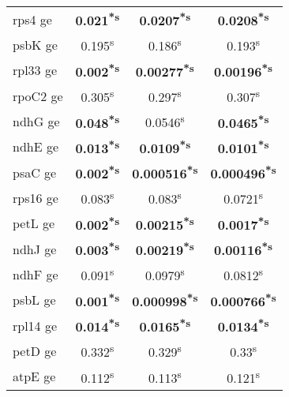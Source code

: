 \documentclass[a4paper]{article}
\begin{document}
\begin{longtable}{l|c|c|c}
rps4 ge&\textbf{0.021\textsuperscript{*}\textsuperscript{s}}&\textbf{0.0207\textsuperscript{*}\textsuperscript{s}}&\textbf{0.0208\textsuperscript{*}\textsuperscript{s}}\\
psbK ge&0.195\textsuperscript{s}&0.186\textsuperscript{s}&0.193\textsuperscript{s}\\
rpl33 ge&\textbf{0.002\textsuperscript{*}\textsuperscript{s}}&\textbf{0.00277\textsuperscript{*}\textsuperscript{s}}&\textbf{0.00196\textsuperscript{*}\textsuperscript{s}}\\
rpoC2 ge&0.305\textsuperscript{s}&0.297\textsuperscript{s}&0.307\textsuperscript{s}\\
ndhG ge&\textbf{0.048\textsuperscript{*}\textsuperscript{s}}&0.0546\textsuperscript{s}&\textbf{0.0465\textsuperscript{*}\textsuperscript{s}}\\
ndhE ge&\textbf{0.013\textsuperscript{*}\textsuperscript{s}}&\textbf{0.0109\textsuperscript{*}\textsuperscript{s}}&\textbf{0.0101\textsuperscript{*}\textsuperscript{s}}\\
psaC ge&\textbf{0.002\textsuperscript{*}\textsuperscript{s}}&\textbf{0.000516\textsuperscript{*}\textsuperscript{s}}&\textbf{0.000496\textsuperscript{*}\textsuperscript{s}}\\
rps16 ge&0.083\textsuperscript{s}&0.083\textsuperscript{s}&0.0721\textsuperscript{s}\\
petL ge&\textbf{0.002\textsuperscript{*}\textsuperscript{s}}&\textbf{0.00215\textsuperscript{*}\textsuperscript{s}}&\textbf{0.0017\textsuperscript{*}\textsuperscript{s}}\\
ndhJ ge&\textbf{0.003\textsuperscript{*}\textsuperscript{s}}&\textbf{0.00219\textsuperscript{*}\textsuperscript{s}}&\textbf{0.00116\textsuperscript{*}\textsuperscript{s}}\\
ndhF ge&0.091\textsuperscript{s}&0.0979\textsuperscript{s}&0.0812\textsuperscript{s}\\
psbL ge&\textbf{0.001\textsuperscript{*}\textsuperscript{s}}&\textbf{0.000998\textsuperscript{*}\textsuperscript{s}}&\textbf{0.000766\textsuperscript{*}\textsuperscript{s}}\\
rpl14 ge&\textbf{0.014\textsuperscript{*}\textsuperscript{s}}&\textbf{0.0165\textsuperscript{*}\textsuperscript{s}}&\textbf{0.0134\textsuperscript{*}\textsuperscript{s}}\\
petD ge&0.332\textsuperscript{s}&0.329\textsuperscript{s}&0.33\textsuperscript{s}\\
atpE ge&0.112\textsuperscript{s}&0.113\textsuperscript{s}&0.121\textsuperscript{s}\\

\end{longtable}
\end{document}
